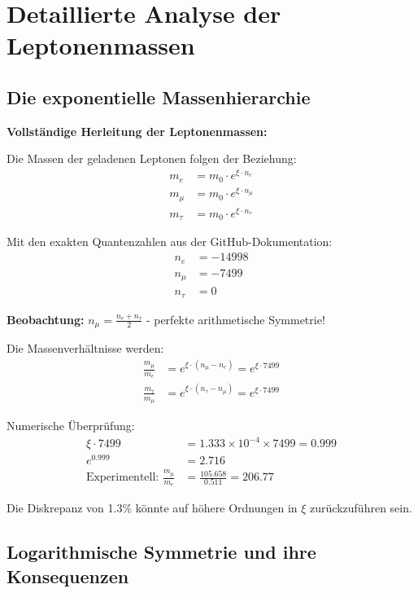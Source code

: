 \documentclass[12pt,a4paper]{article}
\newcommand{\xipar}{\xi}
\begin{document}
	\section{Detaillierte Analyse der Leptonenmassen}
	
	\subsection{Die exponentielle Massenhierarchie}
	
	\begin{beziehung}
		\textbf{Vollständige Herleitung der Leptonenmassen:}
		
		Die Massen der geladenen Leptonen folgen der Beziehung:
		\begin{align}
			m_e &= m_0 \cdot e^{\xipar \cdot n_e} \\
			m_\mu &= m_0 \cdot e^{\xipar \cdot n_\mu} \\
			m_\tau &= m_0 \cdot e^{\xipar \cdot n_\tau}
		\end{align}
		
		Mit den exakten Quantenzahlen aus der GitHub-Dokumentation:
		\begin{align}
			n_e &= -14998 \\
			n_\mu &= -7499 \\
			n_\tau &= 0
		\end{align}
		
		\textbf{Beobachtung:} $n_\mu = \frac{n_e + n_\tau}{2}$ - perfekte arithmetische Symmetrie!
		
		Die Massenverhältnisse werden:
		\begin{align}
			\frac{m_\mu}{m_e} &= e^{\xipar \cdot (n_\mu - n_e)} = e^{\xipar \cdot 7499} \\
			\frac{m_\tau}{m_\mu} &= e^{\xipar \cdot (n_\tau - n_\mu)} = e^{\xipar \cdot 7499}
		\end{align}
		
		Numerische Überprüfung:
		\begin{align}
			\xipar \cdot 7499 &= 1.333 \times 10^{-4} \times 7499 = 0.999 \\
			e^{0.999} &= 2.716 \\
			\text{Experimentell: } \frac{m_\mu}{m_e} &= \frac{105.658}{0.511} = 206.77
		\end{align}
		
		Die Diskrepanz von 1.3\% könnte auf höhere Ordnungen in $\xipar$ zurückzuführen sein.
	\end{beziehung}
	
	\subsection{Logarithmische Symmetrie und ihre Konsequenzen}
	
\end{document}
